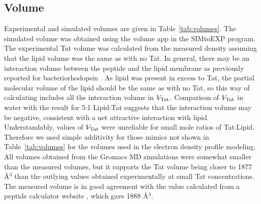 \subsection{Volume}\label{sec:volume_results}
Experimental and simulated volumes are given in Table~\ref{tab:volumes}. The simulated volume was
obtained using the volume app in the SIMtoEXP program. The experimental Tat volume was
calculated from the measured density assuming that the lipid volume was the same as with no
Tat. In general, there may be an interaction volume between the peptide and the lipid membrane
as previously reported for bacteriorhodopsin \cite{Tristram-Nagle86}. As lipid was present in excess to Tat, the
partial molecular volume of the lipid should be the same as with no Tat, so this way of
calculating includes all the interaction volume in $V_\textrm{Tat}$. Comparison of $V_\textrm{Tat}$ in water with the
result for 5:1 Lipid:Tat suggests that the interaction volume may be negative, consistent with a
net attractive interaction with lipid. Understandably, values of $V_\textrm{Tat}$ were unreliable for small
mole ratios of Tat:Lipid. Therefore we used simple additivity for those mimics not shown in
Table~\ref{tab:volumes} for the volumes used in the electron density profile modeling. 
All volumes obtained from the Gromacs MD
simulations were somewhat smaller than the measured volumes, but it supports the Tat volume
being closer to 1877 \AA$^3$ than the outlying values obtained experimentally at small Tat
concentrations. The measured volume is in good agreement with the 
value calculated from a peptide calculator website \cite{peptide_calc}, which
gave 1888 \AA$^3$. 


